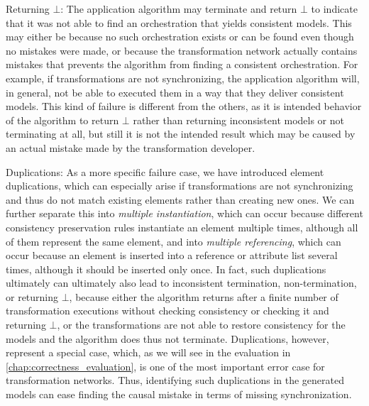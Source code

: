 \begin{properdescription}
    \item[Returning $\bot$:] 
    The application algorithm may terminate and return $\bot$ to indicate that it was not able to find an orchestration that yields consistent models.
    This may either be because no such orchestration exists or can be found even though no mistakes were made, or because the transformation network actually contains mistakes that prevents the algorithm from finding a consistent orchestration.
    For example, if transformations are not synchronizing, the application algorithm will, in general, not be able to executed them in a way that they deliver consistent models.
    This kind of failure is different from the others, as it is intended behavior of the algorithm to return $\bot$ rather than returning inconsistent models or not terminating at all, but still it is not the intended result which may be caused by an actual mistake made by the transformation developer.

    \item[Duplications:] 
    As a more specific failure case, we have introduced element duplications, which can especially arise if transformations are not synchronizing and thus do not match existing elements rather than creating new ones.
    We can further separate this into \emph{multiple instantiation}, which can occur because different consistency preservation rules instantiate an element multiple times, although all of them represent the same element, and into \emph{multiple referencing}, which can occur because an element is inserted into a reference or attribute list several times, although it should be inserted only once. 
    In fact, such duplications ultimately can ultimately also lead to inconsistent termination, non-termination, or returning $\bot$, because either the algorithm returns after a finite number of transformation executions without checking consistency or checking it and returning $\bot$, or the transformations are not able to restore consistency for the models and the algorithm does thus not terminate.
    Duplications, however, represent a special case, which, as we will see in the evaluation in \autoref{chap:correctness_evaluation}, is one of the most important error case for transformation networks.
    Thus, identifying such duplications in the generated models can ease finding the causal mistake in terms of missing synchronization.
\end{properdescription}

